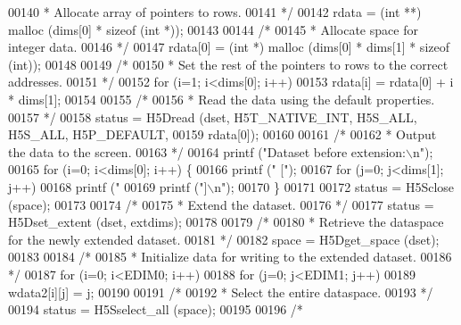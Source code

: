 \begin{DoxyCode}
00140 \textcolor{comment}{     * Allocate array of pointers to rows.}
00141 \textcolor{comment}{     */}
00142     rdata = (\textcolor{keywordtype}{int} **) malloc (dims[0] * \textcolor{keyword}{sizeof} (\textcolor{keywordtype}{int} *));
00143 
00144     \textcolor{comment}{/*}
00145 \textcolor{comment}{     * Allocate space for integer data.}
00146 \textcolor{comment}{     */}
00147     rdata[0] = (\textcolor{keywordtype}{int} *) malloc (dims[0] * dims[1] * \textcolor{keyword}{sizeof} (\textcolor{keywordtype}{int}));
00148 
00149     \textcolor{comment}{/*}
00150 \textcolor{comment}{     * Set the rest of the pointers to rows to the correct addresses.}
00151 \textcolor{comment}{     */}
00152     \textcolor{keywordflow}{for} (i=1; i<dims[0]; i++)
00153         rdata[i] = rdata[0] + i * dims[1];
00154 
00155     \textcolor{comment}{/*}
00156 \textcolor{comment}{     * Read the data using the default properties.}
00157 \textcolor{comment}{     */}
00158     status = H5Dread (dset, H5T\_NATIVE\_INT, H5S\_ALL, H5S\_ALL, H5P\_DEFAULT,
00159                 rdata[0]);
00160 
00161     \textcolor{comment}{/*}
00162 \textcolor{comment}{     * Output the data to the screen.}
00163 \textcolor{comment}{     */}
00164     printf (\textcolor{stringliteral}{"Dataset before extension:\(\backslash\)n"});
00165     \textcolor{keywordflow}{for} (i=0; i<dims[0]; i++) \{
00166         printf (\textcolor{stringliteral}{" ["});
00167         \textcolor{keywordflow}{for} (j=0; j<dims[1]; j++)
00168             printf (\textcolor{stringliteral}{" %
00169         printf (\textcolor{stringliteral}{"]\(\backslash\)n"});
00170     \}
00171 
00172     status = H5Sclose (space);
00173 
00174     \textcolor{comment}{/*}
00175 \textcolor{comment}{     * Extend the dataset.}
00176 \textcolor{comment}{     */}
00177     status = H5Dset\_extent (dset, extdims);
00178 
00179     \textcolor{comment}{/*}
00180 \textcolor{comment}{     * Retrieve the dataspace for the newly extended dataset.}
00181 \textcolor{comment}{     */}
00182     space = H5Dget\_space (dset);
00183 
00184     \textcolor{comment}{/*}
00185 \textcolor{comment}{     * Initialize data for writing to the extended dataset.}
00186 \textcolor{comment}{     */}
00187     \textcolor{keywordflow}{for} (i=0; i<EDIM0; i++)
00188         \textcolor{keywordflow}{for} (j=0; j<EDIM1; j++)
00189             wdata2[i][j] = j;
00190 
00191     \textcolor{comment}{/*}
00192 \textcolor{comment}{     * Select the entire dataspace.}
00193 \textcolor{comment}{     */}
00194     status = H5Sselect\_all (space);
00195 
00196     \textcolor{comment}{/*}
}
\end{DoxyCode}

